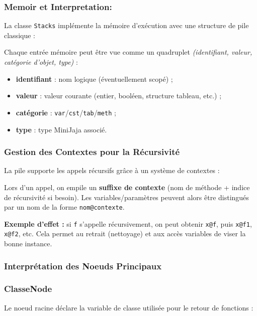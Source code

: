 \subsubsection{Memoir et Interpretation:}

La classe \texttt{Stacks} implémente la mémoire d'exécution avec une structure de pile classique :

Chaque entrée mémoire peut être vue comme un quadruplet \emph{(identifiant, valeur, catégorie d'objet, type)} :
\begin{itemize}
    \item \textbf{identifiant} : nom logique (éventuellement scopé) ;
    \item \textbf{valeur} : valeur courante (entier, booléen, structure tableau, etc.) ;
    \item \textbf{catégorie} : \texttt{var}/\texttt{cst}/\texttt{tab}/\texttt{meth} ;
    \item \textbf{type} : type MiniJaja associé.
\end{itemize}

\subsubsection{Gestion des Contextes pour la Récursivité}

La pile supporte les appels récursifs grâce à un système de contextes :

Lors d'un appel, on empile un \textbf{suffixe de contexte} (nom de méthode + indice de récursivité si besoin). Les variables/paramètres peuvent alors être distingués par un nom de la forme \texttt{nom@contexte}.

\medskip
\noindent\textbf{Exemple d'effet :} si \texttt{f} s'appelle récursivement, on peut obtenir \texttt{x@f}, puis \texttt{x@f1}, \texttt{x@f2}, etc. Cela permet au retrait (nettoyage) et aux accès variables de viser la bonne instance.

\subsubsection{Interprétation des Noeuds Principaux}

\subsubsection{ClasseNode}

Le noeud racine déclare la variable de classe utilisée pour le retour de fonctions :

